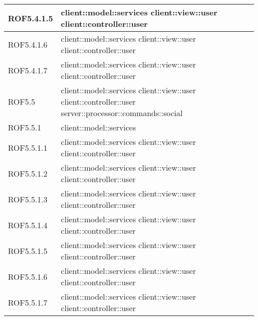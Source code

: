 \begin{center}
\begin{longtable}{| p{4cm} | p{8cm} |}
\hline
ROF5.4.1.5 & client::model::services \newline client::view::user \newline client::controller::user \\
\hline
ROF5.4.1.6 & client::model::services \newline client::view::user \newline client::controller::user \\
\hline
ROF5.4.1.7 & client::model::services \newline client::view::user \newline client::controller::user \\
\hline
ROF5.5 & client::model::services \newline client::view::user \newline client::controller::user \newline server::processor::commands::social \\
\hline
ROF5.5.1 & client::model::services \\
\hline
ROF5.5.1.1 & client::model::services \newline client::view::user \newline client::controller::user \\
\hline
ROF5.5.1.2 & client::model::services \newline client::view::user \newline client::controller::user \\
\hline
ROF5.5.1.3 & client::model::services \newline client::view::user \newline client::controller::user \\
\hline
ROF5.5.1.4 & client::model::services \newline client::view::user \newline client::controller::user \\
\hline
ROF5.5.1.5 & client::model::services \newline client::view::user \newline client::controller::user \\
\hline
ROF5.5.1.6 & client::model::services \newline client::view::user \newline client::controller::user \\
\hline
ROF5.5.1.7 & client::model::services \newline client::view::user \newline client::controller::user \\

\end{longtable}
\end{center}
